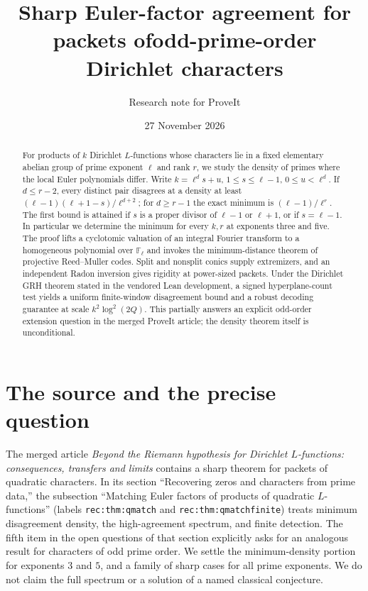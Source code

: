 \documentclass[11pt]{article}
\title{Sharp Euler-factor agreement for packets of\newline odd-prime-order Dirichlet characters}
\author{Research note for ProveIt}
\date{27 November 2026}
\theoremstyle{remark}\newtheorem{remark}[theorem]{Remark}
\newcommand{\F}{\mathbb F}
\begin{document}
\maketitle
\begin{abstract}
For products of $k$ Dirichlet $L$-functions whose characters lie in a fixed elementary abelian group of prime exponent $\ell$ and rank $r$, we study the density of primes where the local Euler polynomials differ. Write $k=\ell^d s+u$, $1\le s\le\ell-1$, $0\le u<\ell^d$. If $d\le r-2$, every distinct pair disagrees at a density at least $(\ell-1)(\ell+1-s)/\ell^{d+2}$; for $d\ge r-1$ the exact minimum is $(\ell-1)/\ell^r$. The first bound is attained if $s$ is a proper divisor of $\ell-1$ or $\ell+1$, or if $s=\ell-1$. In particular we determine the minimum for every $k,r$ at exponents three and five. The proof lifts a cyclotomic valuation of an integral Fourier transform to a homogeneous polynomial over $\F_\ell$ and invokes the minimum-distance theorem of projective Reed--Muller codes. Split and nonsplit conics supply extremizers, and an independent Radon inversion gives rigidity at power-sized packets. Under the Dirichlet GRH theorem stated in the vendored Lean development, a signed hyperplane-count test yields a uniform finite-window disagreement bound and a robust decoding guarantee at scale $k^2\log^2(2Q)$. This partially answers an explicit odd-order extension question in the merged ProveIt article; the density theorem itself is unconditional.
\end{abstract}

\section{The source and the precise question}
The merged article \emph{Beyond the Riemann hypothesis for Dirichlet $L$-functions: consequences, transfers and limits} \cite{article} contains a sharp theorem for packets of quadratic characters. In its section ``Recovering zeros and characters from prime data,'' the subsection ``Matching Euler factors of products of quadratic $L$-functions'' (labels \texttt{rec:thm:qmatch} and \texttt{rec:thm:qmatchfinite}) treats minimum disagreement density, the high-agreement spectrum, and finite detection. The fifth item in the open questions of that section explicitly asks for an analogous result for characters of odd prime order. We settle the minimum-density portion for exponents $3$ and $5$, and a family of sharp cases for all prime exponents. We do not claim the full spectrum or a solution of a named classical conjecture.
\end{document}
